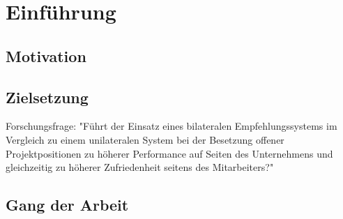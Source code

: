 \chapter{Einführung}
\label{ch:intro}

\section{Motivation}
\label{sec:intro:motivation}

\section{Zielsetzung}
\label{sec:intro:zielsetzung}
Forschungsfrage: "Führt der Einsatz eines bilateralen Empfehlungssystems im Vergleich zu einem unilateralen System bei der Besetzung offener Projektpositionen zu höherer Performance auf Seiten des Unternehmens und gleichzeitig zu höherer Zufriedenheit seitens des Mitarbeiters?"

\section{Gang der Arbeit}
\label{sec:intro:gangDerArbeit}

